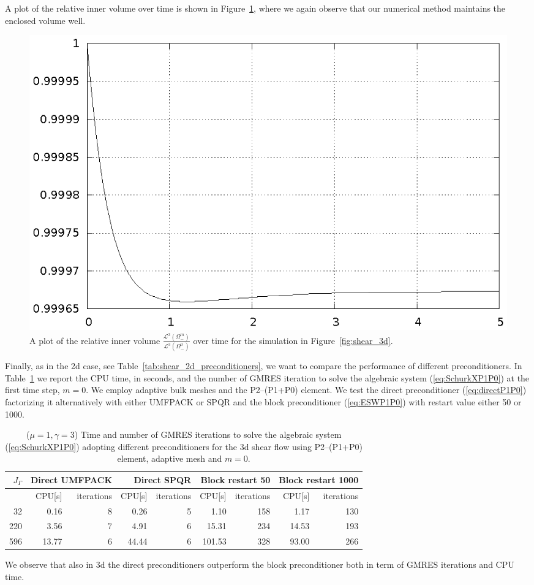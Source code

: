 A plot of the relative inner volume over time is shown in
Figure~\ref{fig:shear_3d_bulk_inner_volume}, where we again observe that our
numerical method maintains the enclosed volume well.
\begin{figure}[htbp]
\centering
\includegraphics[width=.45\textwidth]
{figures/stokes/3d_shear_bulk_inner_volume.ps}
\caption[Stokes 3d shear flow inner volume]
{A plot of the relative inner volume
$\frac{\mathcal{L}^3(\Omega^m_-)}{\mathcal{L}^3(\Omega^0_-)}$
over time for the simulation in Figure~\ref{fig:shear_3d}.}
\label{fig:shear_3d_bulk_inner_volume}
\end{figure}

Finally, as in the 2d case, see Table~\ref{tab:shear_2d_preconditioners}, we
want to compare the performance of different preconditioners. In
Table~\ref{tab:shear_3d_preconditioners} we report the CPU time, in seconds,
and the number of GMRES iteration to solve the algebraic system
(\ref{eq:SchurkXP1P0}) at the first time step, $m=0$. We employ adaptive bulk
meshes and the P2--(P1+P0) element. We test the direct preconditioner
(\ref{eq:directP1P0}) factorizing it alternatively with either UMFPACK or SPQR
and the block preconditioner (\ref{eq:ESWP1P0}) with restart value either 50 or
1000.
\begin{table}
\center
\hspace*{-3.25cm}
\begin{tabular}{rrrrrrrrr}
\hline
$J_\Gamma$ & \multicolumn{2}{r}{Direct UMFPACK} &
\multicolumn{2}{r}{Direct SPQR} & \multicolumn{2}{r}{Block restart 50} &
\multicolumn{2}{r}{Block restart 1000} \\
\hline
 & CPU[s] & iterations & CPU[s] & iterations & CPU[s] & iterations & CPU[s] &
iterations \\
\hline
 32 &  0.16 & 8 &  0.26 & 5 &   1.10 & 158 &  1.17 & 130 \\
220 &  3.56 & 7 &  4.91 & 6 &  15.31 & 234 & 14.53 & 193 \\
596 & 13.77 & 6 & 44.44 & 6 & 101.53 & 328 & 93.00 & 266 \\
\hline
\end{tabular}
\hspace*{-3.25cm}
\caption[Stokes 3d shear flow preconditioners comparison]
{($\mu=1,\gamma=3$) Time and number of GMRES iterations to solve the algebraic
system (\ref{eq:SchurkXP1P0}) adopting different preconditioners for the 3d
shear flow using P2--(P1+P0) element, adaptive mesh and $m=0$.}
\label{tab:shear_3d_preconditioners}
\end{table}
We observe that also in 3d the direct preconditioners outperform the block
preconditioner both in term of GMRES iterations and CPU time.